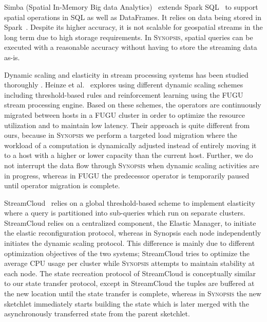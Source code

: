 Simba (Spatial In-Memory Big data Analytics)~\cite{xiesimba} extends Spark SQL~\cite{armbrust2015spark} to support spatial operations in SQL as well as DataFrames. It relies on data being stored in Spark~\cite{zaharia2010spark}. Despite its higher accuracy, it is not scalable for geospatial streams in the long term due to high storage requirements. In \textsc{Synopsis}, spatial queries can be executed with a reasonable accuracy without having to store the streaming data as-is.

Dynamic scaling and elasticity in stream processing systems has been studied thoroughly \cite{heinze2014auto, gulisano2012streamcloud, castro2013integrating, loesing2012stormy, heinze2013elastic, schneider2009elastic}.
Heinze et al.~\cite{heinze2014auto} explores using different dynamic scaling schemes including threshold-based rules and reinforcement learning using the FUGU~\cite{heinze2013elastic} stream processing engine.
Based on these schemes, the operators are continuously migrated between hosts in a FUGU cluster in order to optimize the resource utilization and to maintain low latency.
Their approach is quite different from ours, because in \textsc{Synopsis} we perform a targeted load migration where the workload of a computation is dynamically adjusted instead of entirely moving it to a host with a higher or lower capacity than the current host.
Further, we do not interrupt the data flow through \textsc{Synopsis} when dynamic scaling activities are in progress, whereas in FUGU the predecessor operator is temporarily paused until operator migration is complete. 

StreamCloud~\cite{gulisano2012streamcloud} relies on a global threshold-based scheme to implement elasticity where a query is partitioned into sub-queries which run on separate clusters.
StreamCloud relies on a centralized component, the Elastic Manager, to initiate the elastic reconfiguration protocol, whereas in Synopsis each node independently initiates the dynamic scaling protocol.
This difference is mainly due to different optimization objectives of the two systems; StreamCloud tries to optimize the average CPU usage per cluster while \textsc{Synopsis} attempts to maintain stability at each node.
The state recreation protocol of StreamCloud is conceptually similar to our state transfer protocol, except in StreamCloud the tuples are buffered at the new location until the state transfer is complete, whereas in \textsc{Synopsis} the new sketchlet immediately starts building the state which is later merged with the asynchronously transferred state from the parent sketchlet.

